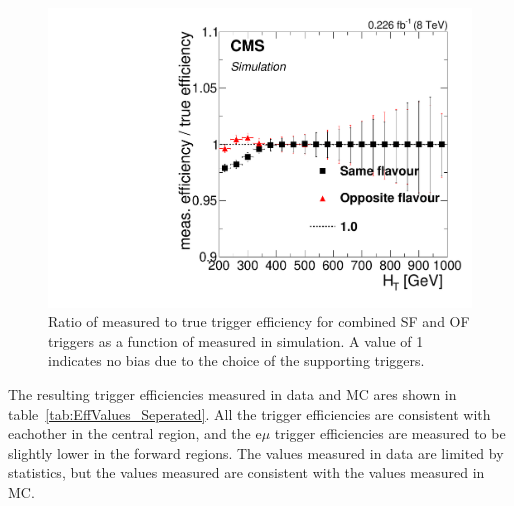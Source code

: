 \begin{figure}[htb]
  \begin{center}
    \includegraphics[scale=0.35]{bkgd/figs/Triggereff_AlphaTSyst_PFHT_HighHTExclusive_Run2015_25ns_HT_None.pdf}
    \caption{
      \label{fig:triggerBias}
      Ratio of measured to true trigger efficiency for combined SF and OF triggers as a function of \HT measured in \ttbar simulation.
      A value of 1 indicates no bias due to the choice of the supporting triggers.
    }
  \end{center}
\end{figure}

The resulting trigger efficiencies measured in data and MC ares shown in table~\ref{tab:EffValues_Seperated}.
All the trigger efficiencies are consistent with eachother in the central region,
and the e$\mu$ trigger efficiencies are measured to be slightly lower in the forward regions.
The values measured in data are limited by statistics, but the values measured are consistent with the values measured in MC.

